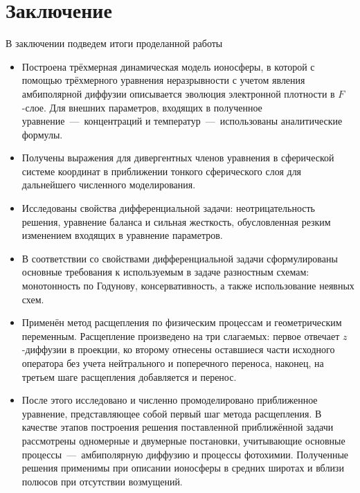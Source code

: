 \documentclass[14pt, a4paper, fleqn]{extarticle}
\begin{document}
\newpage

\section{Заключение}

В заключении подведем итоги проделанной работы

\begin{itemize}

\item
Построена трёхмерная динамическая модель ионосферы, в которой с помощью трёхмерного уравнения неразрывности с учетом явления амбиполярной диффузии описывается эволюция электронной плотности в $F$-слое. Для внешних параметров, входящих в полученное уравнение~---~концентраций и температур~---~использованы аналитические формулы.

\item
Получены выражения для дивергентных членов уравнения в сферической системе координат в приближении тонкого сферического слоя для дальнейшего численного моделирования.

\item 
Исследованы свойства дифференциальной задачи: неотрицательность решения, уравнение баланса и сильная жесткость, обусловленная резким изменением входящих в уравнение параметров.

\item 
В соответствии со свойствами дифференциальной задачи сформулированы основные требования к используемым в задаче разностным схемам: монотонность по Годунову, консервативность, а также использование неявных схем.

\item 
Применён метод расщепления по физическим процессам и геометрическим переменным. Расщепление произведено на три слагаемых: первое отвечает $z$-диффузии в проекции, ко второму отнесены оставшиеся части исходного оператора без учета нейтрального и поперечного переноса, наконец, на третьем шаге расщепления добавляется и перенос.

\item 
После этого исследовано и численно промоделировано приближенное уравнение, представляющее собой первый шаг метода расщепления. В качестве этапов построения решения поставленной приближённой задачи рассмотрены одномерные и двумерные постановки, учитывающие основные процессы~---~амбиполярную диффузию и процессы фотохимии. Полученные решения применимы при описании ионосферы в средних широтах и вблизи полюсов при отсутствии возмущений.


\end{itemize}
\end{document}
